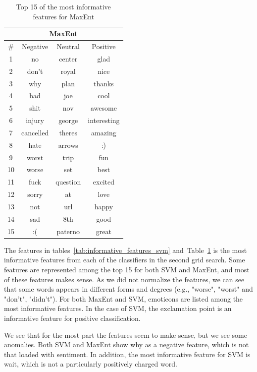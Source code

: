 \begin{table}[!htb]
	\centering
	\begin{tabular}{|c|c|c|c|}		
	\multicolumn{4}{c}{MaxEnt} \\ \hline
	
	\# & Negative & Neutral & Positive \\ \hline\hline
	
	1 & no 	& center & glad \\ \hline
	2 & don't 	& royal & nice \\ \hline
	3 & why 	& plan & thanks \\ \hline
	4 & bad 	& joe & cool \\ \hline
	5 & shit 	& nov & awesome \\ \hline
	6 & injury 	& george & interesting \\ \hline
	7 & cancelled 	& theres & amazing \\ \hline
	8 & hate 	& arrows & :) \\ \hline
	9 & worst 	& trip & fun \\ \hline
	10 & worse 	& set & best \\ \hline
	11 & fuck 	& question & excited \\ \hline
	12 & sorry 	& at & love \\ \hline
	13 & not 	& url & happy \\ \hline
	14 & sad 	& 8th & good \\ \hline
	15 & :( 	& paterno & great \\ \hline
	\end{tabular}
	
	\caption[Most informative features]{Top 15 of the most informative features for MaxEnt}
	\label{tab:informative_features_maxent}
\end{table}


The features in tables~\ref{tab:informative_features_svm} and~Table~\ref{tab:informative_features_maxent}  is the most informative features from each of the classifiers in the second grid search. Some features are represented among the top 15 for both SVM and MaxEnt, and most of these features makes sense. As we did not normalize the features, we can see that some words appears in different forms and degrees (e.g., "worse", "worst" and "don't", "didn't"). For both MaxEnt and SVM, emoticons are listed among the most informative features. In the case of SVM, the exclamation point is an informative feature for positive classification.

We see that for the most part the features seem to make sense, but we see some anomalies. Both SVM and MaxEnt show why as a negative feature, which is not that loaded with sentiment. In addition, the most informative feature for SVM is wait, which is not a particularly positively charged word.


